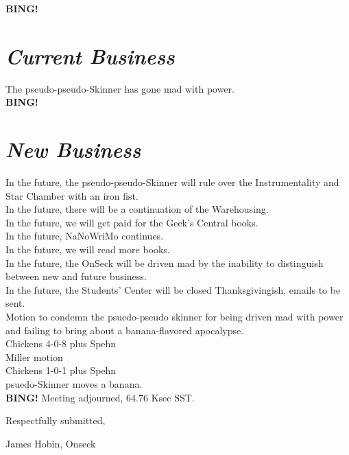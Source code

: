 \documentclass[10pt]{article}
\newcommand{\bing}{{\bf BING!} }
\newcommand{\goto}[1]{\bing \vskip 12pt \section*{{\em{#1}}}}
\newcommand{\ps}{ plus Spehn\xspace}
\newcommand{\onseck}{James Hobin, Onseck}
\begin{document}
\goto{Current Business}
The pseudo-pseudo-Skinner has gone mad with power. \\

\goto{New Business}
In the future, the pseudo-pseudo-Skinner will rule over the Instrumentality and Star Chamber with an iron fist. \\
In the future, there will be a continuation of the Warehousing. \\
In the future, we will get paid for the Geek's Central books. \\
In the future, NaNoWriMo continues. \\
In the future, we will read more books. \\
In the future, the OnSeck will be driven mad by the inability to distinguish between new and future business. \\
In the future, the Students' Center will be closed Thanksgivingish, emails to be sent. \\

Motion to condemn the psuedo-pseudo skinner for being driven mad with power and failing to bring about a banana-flavored apocalypse. \\
Chickens 4-0-8 \ps \\
Miller motion \\
Chickens 1-0-1 \ps \\

psuedo-Skinner moves a banana. \\

\bing
\noindent
Meeting adjourned, 64.76 Ksec SST.

\vspace{18pt}

\centerline{Respectfully submitted,}
\centerline{\onseck}
\end{document}
